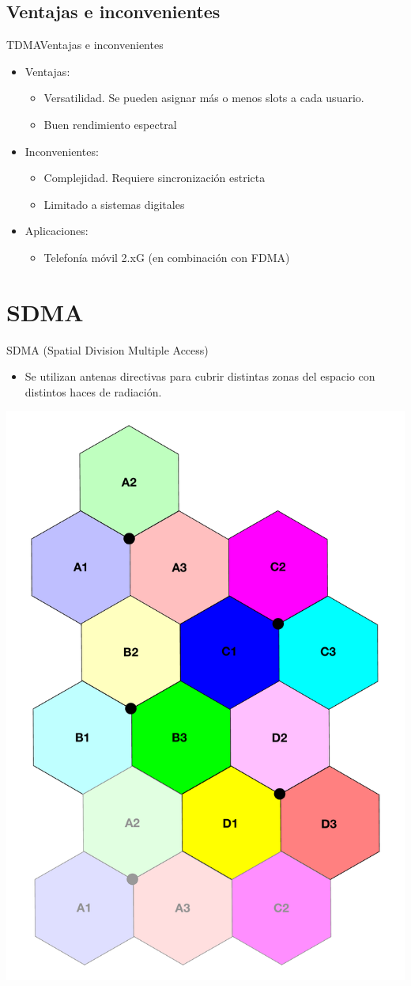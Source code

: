\documentclass[10pt,compress]{beamer} %
\begin{document}
\subsection{Ventajas e inconvenientes}
\begin{frame}{TDMA}{Ventajas e inconvenientes}
  \begin{itemize}
    \item Ventajas:
      \begin{itemize}
        \item Versatilidad. Se pueden asignar más o menos slots a cada usuario. 
        \item Buen rendimiento espectral
      \end{itemize}
    \item Inconvenientes:
      \begin{itemize}
        \item Complejidad. Requiere sincronización estricta
        \item Limitado a sistemas digitales
      \end{itemize}
    \item Aplicaciones:
      \begin{itemize}
        \item Telefonía móvil 2.xG (en combinación con FDMA)
      \end{itemize}
  \end{itemize}
\end{frame}


\section{SDMA}
\begin{frame}{SDMA (Spatial Division Multiple Access)}
  \begin{itemize}
    \item Se utilizan antenas directivas para cubrir distintas zonas del espacio con distintos haces de radiación.
  \end{itemize}
  \centering \includegraphics[width=0.4\linewidth]{Figuras/SDMA.pdf}
\end{frame}
\end{document}
